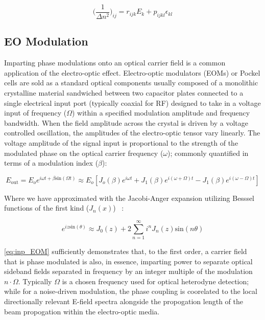 \begin{equation}\label{eq:indicgen}
	\bigg( \frac{1}{\Delta n^2} \bigg)_{ij} = r_{ijk}E_k + p_{ijkl} \epsilon_{kl}
\end{equation}



\subsection{EO Modulation}\label{sec:EOM}
Imparting phase modulations onto an optical carrier field is a common application of the electro-optic effect. Electro-optic modulators (EOMs) or Pockel cells are sold as a standard optical components usually composed of a monolithic crystalline material sandwiched between two capacitor plates connected to a single electrical input port (typically coaxial for RF) designed to take in a voltage input of frequency ($\Omega$) within a specified modulation amplitude and frequency bandwidth. When the field amplitude across the crystal is driven by a voltage controlled oscillation, the amplitudes of the electro-optic tensor vary linearly. The voltage amplitude of the signal input is proportional to the strength of the modulated phase on the optical carrier frequency ($\omega$); commonly quantified in terms of a modulation index ($\beta$):


\begin{equation}\label{eq:inp_EOM}
	E_\mathrm{out} = E_o e^{i \omega t + \beta \mathrm{sin}( \Omega t)} \approx E_o [J_o(\beta)e^{i \omega t} + J_1(\beta) e^{i(\omega + \Omega)t} - J_1(\beta) e^{i(\omega - \Omega)t}]  
\end{equation}

\noindent Where we have approximated with the Jacobi-Anger expansion utilizing Besssel functions of the first kind ($J_n(x)$) ~\cite{jacobianger}:

\begin{equation}\label{eq:jacobi_anger}
	e^{iz \mathrm{sin}(\theta)} \approx J_0(z) + 2 \sum_{n=1}^{\infty} i^n J_n(z) \mathrm{sin} (n \theta)
\end{equation}

\ref{eq:inp_EOM} sufficiently demonstrates that, to the first order, a carrier field that is phase modulated is also, in essence, imparting power to separate optical sideband fields separated in frequency by an integer multiple of the modulation $n \cdot \Omega$. Typically $\Omega$ is a chosen frequency used for optical heterodyne detection; while for a noise-driven modulation, the phase coupling is coorelated to the local directionally relevant E-field spectra alongside the propogation length of the beam propogation within the electro-optic media.

